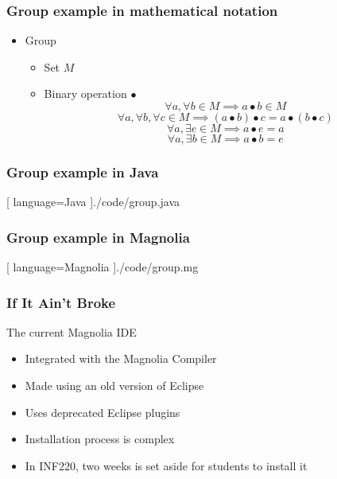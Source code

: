 \begin{frame}
  \frametitle{Group example in mathematical notation}
  \begin{itemize}
    \item Group
    \begin{itemize}
      \item Set $M$
      \item Binary operation $\bullet$
      \begin{equation}
       \forall a, \forall b \in M \implies a \bullet b \in M
      \end{equation}
      \begin{equation}
        \forall a, \forall b, \forall c \in M \implies
        (a \bullet b) \bullet c = a \bullet (b \bullet c)
      \end{equation}
      \begin{equation}
        \forall a, \exists e \in M \implies a \bullet e = a
      \end{equation}
      \begin{equation}
        \forall a, \exists b \in M \implies a \bullet b = e
      \end{equation}
    \end{itemize}
  \end{itemize}
\end{frame}

\begin{frame}
    \frametitle{Group example in Java}
    \begin{center}
      
      [ language=Java
      ]{./code/group.java}
    \end{center}
\end{frame}

\begin{frame}
    \frametitle{Group example in Magnolia}
    \begin{center}
      
      [ language=Magnolia
      ]{./code/group.mg}
    \end{center}
\end{frame}

\begin{frame}
  \frametitle{If It Ain't Broke}
  The current Magnolia IDE
  \pause
  \begin{itemize}
    \item Integrated with the Magnolia Compiler
    \pause
    \item Made using an old version of Eclipse
    \pause
    \item Uses deprecated Eclipse plugins
    \pause
    \item Installation process is complex
    \pause
    \item In INF220, two weeks is set aside for students to install it
  \end{itemize}
\end{frame}

